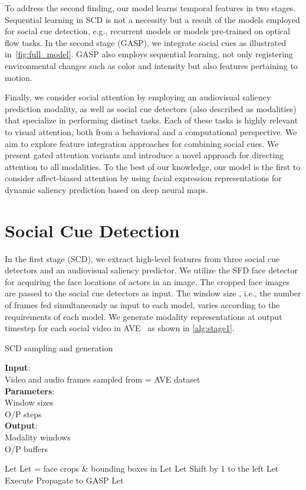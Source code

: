 \documentclass{article}
\begin{document}
To address the second finding, our model learns temporal features in two stages. Sequential learning in SCD is not a necessity but a result of the models employed for social cue detection, e.g., recurrent models or models pre-trained on optical flow tasks. In the second stage (GASP), we integrate social cues as illustrated in~\autoref{fig:full_model}. GASP also employs sequential learning, not only registering environmental changes such as color and intensity but also features pertaining to motion.  

Finally, we consider social attention by employing an audiovisual saliency prediction modality, as well as social cue detectors (also described as modalities) that specialize in performing distinct tasks. Each of these tasks is highly relevant to visual attention, both from a behavioral and a computational perspective. 
We aim to explore feature integration approaches for combining social cues. We present gated attention variants and introduce a novel approach for directing attention to all modalities. To the best of our knowledge, our model is the first to consider affect-biased attention by using facial expression representations for dynamic saliency prediction based on deep neural maps.

\section{Social Cue Detection}
\label{sec:stage1}
In the first stage (SCD), we extract high-level features from three social cue detectors and an audiovisual saliency predictor. We utilize the SFD face detector~\cite{zhang2017sfd} for acquiring the face locations of actors in an image. The cropped face images are passed to the social cue detectors as input. The window size , i.e., the number of frames fed simultaneously as input to each model, varies according to the requirements of each model. We generate modality representations at output timestep  for each social video in AVE~\cite{tavakoli2020deep} as shown in \autoref{alg:stage1}.

\begin{algorithm}[h!]
\caption{SCD sampling and generation}
\label{alg:stage1}
\textbf{Input}: \\
Video and audio frames sampled from  = AVE dataset \\
\textbf{Parameters}:\\
Window sizes \\
O/P steps \\
\textbf{Output}: \\
Modality windows \\ 
O/P buffers 
\begin{algorithmic}[1] 
\STATE Let 
\STATE Let  = face crops \& bounding boxes in  
\IF {}
\STATE Let 
\STATE Let 
\ENDFOR
\ELSE
\STATE Shift  by 1 to the left
\STATE Let 
\ENDIF
\STATE Execute 
\ENDFOR
\STATE Propagate  to GASP
\STATE Let 
\ENDFOR
\ENDFOR
\end{algorithmic}
\end{algorithm}
\end{document}
